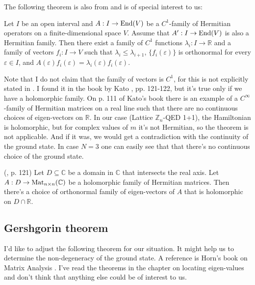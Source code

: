 The following theorem is also from \cite{rellich} and is of special interest to us:
\begin{theorem}\label{thm:pert}
Let $I$ be an open interval and $A : I \rightarrow \operatorname{End}(V)$ be a $C^1$-family of Hermitian operators on a finite-dimensional space $V$. Assume that $A^\prime : I \rightarrow \operatorname{End}(V)$ is also a Hermitian family. Then there exist a family of $C^1$ functions $\lambda_i : I \rightarrow \mathbb R$ and a family of vectors $f_i : I \rightarrow V$ such that $\lambda_i \leq \lambda_{i+1}$, $\{f_i(\varepsilon)\}$ is orthonormal for every $\varepsilon \in I$, and $A(\varepsilon) f_i(\varepsilon) = \lambda_i(\varepsilon)f_i(\varepsilon)$.
\end{theorem}
Note that I do not claim that the family of vectors is $C^1$, for this is not explicitly stated in \cite{rellich}. 
I found it in the book by Kato \cite{kato}, pp. 121-122, but it's true only if we have a holomorphic family. On p. 111 of Kato's book there is an example of a $C^{\infty}$-family of Hermitian matrices on a real line such that there are no continuous choices of eigen-vectors on $\mathbb R$. In our case (Lattice $\mathbb Z_n$-QED 1+1), the Hamiltonian is holomorphic, but for complex values of $m$ it's not Hermitian, so the theorem is not applicable. And if it was, we would get a contradiction with the continuity of the ground state. In case $N=3$ one can easily see that that there's no continuous choice of the ground state.
\begin{theorem} (\cite{kato}, p. 121)
Let $D \subseteq \mathbb C$ be a domain in $\mathbb C$ that intersects the real axis. Let $A : D \rightarrow \operatorname{Mat}_{n\times n}(\mathbb C)$ be a holomorphic family of Hermitian matrices. Then there's a choice of orthonormal family of eigen-vectors of $A$ that is holomorphic on $D \cap \mathbb R$.
\end{theorem}

\subsection{Gershgorin theorem}
I'd like to adjust the following theorem for our situation. It might help us to determine the non-degeneracy of the ground state. A reference is Horn's book on Matrix Analysis \cite{horn}. I've read the theorems in the chapter on locating eigen-values and don't think that anything else could be of interest to us.

